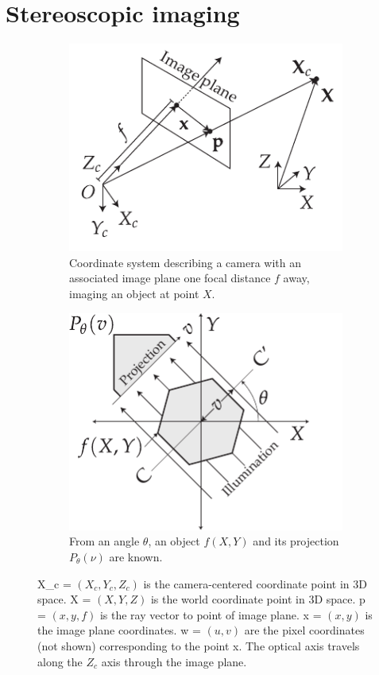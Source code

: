 \documentclass{osa-article}
\begin{document}
\section*{Stereoscopic imaging}

\begin{figure}
  \centering
  \begin{subfigure}[t]{0.48\linewidth}
    \centering
    \includegraphics{./figures/coordinate_system}
    \caption[Coordinate system]{Coordinate system describing a camera with an associated image plane one focal distance \(f\) away, imaging an object at point \(X\).
    }\label{fig:coordinate_system_flopt}
  \end{subfigure}\hfill
  \begin{subfigure}[t]{0.48\linewidth}
    \centering
    \includegraphics{./figures/OPT_digram}
    \caption[Principle of OPT]{From an angle \(\theta \), an object \(f(X,Y)\) and its projection \(P_\theta(\nu)\) are known.}\label{fig:OPT_digram}
  \end{subfigure}
  \caption[Coordinates and OPT]{\gls*{X_c} = \((X_c,Y_c,Z_c)\) is the camera-centered coordinate point in 3D space.
    \gls*{X} = \((X,Y,Z)\) is the world coordinate point in 3D space.
    \gls*{p} = \((x,y,f)\) is the ray vector to point of image plane.
    \gls*{x} = \((x,y)\) is the image plane coordinates.
    \gls*{w} = \((u,v)\) are the pixel coordinates (not shown) corresponding to the point \gls*{x}.
    The optical axis travels along the \(Z_c\) axis through the image plane.}\label{fig:single-view-coordinates}
\end{figure}
\end{document}
